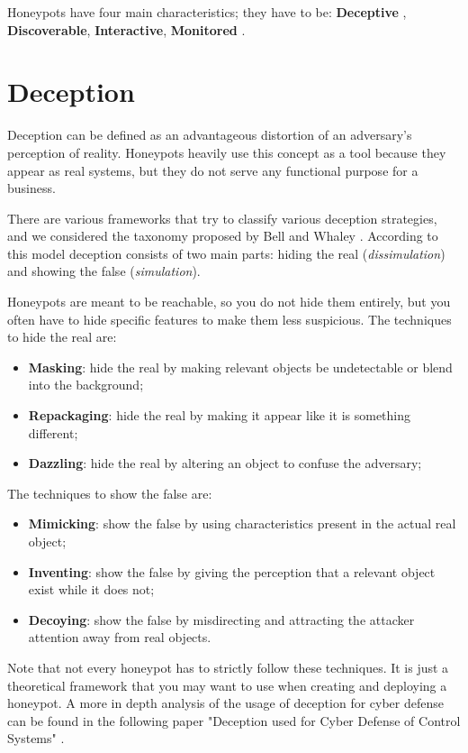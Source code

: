 \documentclass[epsfig,a4paper,11pt,titlepage,oneside,openany]{book}
\begin{document}
Honeypots have four main characteristics; they have to be: \textbf{Deceptive} , \textbf{Discoverable}, \textbf{Interactive}, \textbf{Monitored} \cite{sanders2020intrusion}.

\section{Deception}

Deception can be defined as an advantageous distortion of an adversary's perception of reality. Honeypots heavily use this concept as a tool because they appear as real systems, but they do not serve any functional purpose for a business.

There are various frameworks that try to classify various deception strategies, and we considered the taxonomy proposed by Bell and Whaley \cite{Whaley}. According to this model deception consists of two main parts: hiding the real (\textit{dissimulation}) and showing the false (\textit{simulation}).

Honeypots are meant to be reachable, so you do not hide them entirely, but you often have to hide specific features to make them less suspicious.
The techniques to hide the real are:
\begin{itemize}
\itemsep0em 
\item \textbf{Masking}: hide the  real by making relevant objects be undetectable or blend into the background;
\item \textbf{Repackaging}: hide the  real by making it appear like it is something different;
\item \textbf{Dazzling}: hide the real by altering an object to confuse the adversary;
\end{itemize}

The techniques to show the false are:
\begin{itemize}
\itemsep0em 
\item \textbf{Mimicking}: show the false by using characteristics present in the actual real object;
\item \textbf{Inventing}: show the false by giving the perception that a relevant object exist while it does not; 
\item \textbf{Decoying}: show the false by misdirecting and attracting the attacker attention away from real objects.
\end{itemize}
Note that not every honeypot has to strictly follow these techniques. It is just a theoretical framework that you may want to use when creating and deploying a honeypot. 
A more in depth analysis of the usage of deception for cyber defense can be found in the following paper "Deception used for Cyber Defense of  Control Systems" \cite{deception_defense}.
\end{document}
